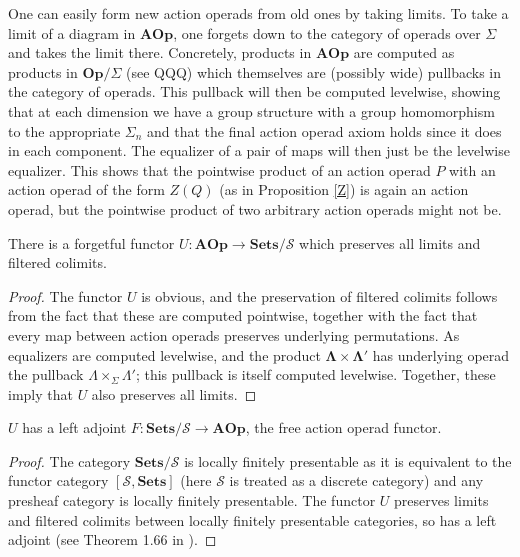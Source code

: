 \documentclass{amsbook} %
\newcommand{\mb}{\mathbf}
\renewcommand{\SS}{\mathcal{S}}
\numberwithin{section}{chapter}
\begin{document}
\begin{example}
One can easily form new action operads from old ones by taking limits.  To take a limit of a diagram in $\mb{AOp}$, one forgets down to the category of operads over $\Sigma$ and takes the limit there.  Concretely, products in $\mb{AOp}$ are computed as products in $\mb{Op}/\Sigma$ (see QQQ) which themselves are (possibly wide) pullbacks in the category of operads.  This pullback will then be computed levelwise, showing that at each dimension we have a group structure with a group homomorphism to the appropriate $\Sigma_{n}$ and that the final action operad axiom holds since it does in each component.  The equalizer of a pair of maps will then just be the levelwise equalizer.  This shows that the pointwise product of an action operad $P$ with an action operad of the form $Z(Q)$ (as in Proposition \ref{Z}) is again an action operad, but the pointwise product of two arbitrary action operads might not be.
\end{example}
\begin{thm}\label{underlyingSS}
There is a forgetful functor $U:\mb{AOp} \rightarrow \mb{Sets}/\SS$ which preserves all limits and filtered colimits.
\end{thm}

\begin{proof}
The functor $U$ is obvious, and the preservation of filtered colimits follows from the fact that these are computed pointwise, together with the fact that every map between action operads preserves underlying permutations.
As equalizers are computed levelwise, and the product $\mb{\Lambda} \times \mb{\Lambda}'$ has underlying operad the pullback $\Lambda \times_{\Sigma} \Lambda'$; this pullback is itself computed levelwise.  Together, these imply that $U$ also preserves all limits.
\end{proof}

\begin{cor}
$U$ has a left adjoint $F:\mb{Sets}/\SS \rightarrow \mb{AOp}$, the free action operad functor.
\end{cor}
\begin{proof}
The category $\mb{Sets}/\SS$ is locally finitely presentable as it is equivalent to the functor category $[\SS, \mb{Sets}]$ (here $\SS$ is treated as a discrete category) and any presheaf category is locally finitely presentable.  The functor $U$ preserves limits and filtered colimits between locally finitely presentable categories, so has a left adjoint (see Theorem 1.66 in \cite{ar}).
\end{proof}
\end{document}
